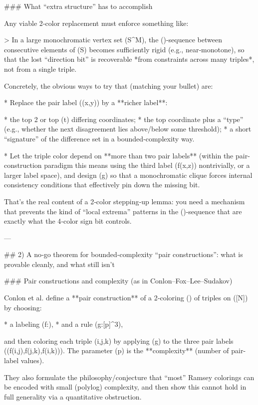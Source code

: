 ### What “extra structure” has to accomplish

Any viable 2‑color replacement must enforce something like:

> In a large monochromatic vertex set (S^M), the (\delta)-sequence between consecutive elements of (S) becomes sufficiently rigid (e.g., near‑monotone), so that the lost “direction bit” is recoverable *from constraints across many triples*, not from a single triple.

Concretely, the obvious ways to try that (matching your bullet) are:

* Replace the pair label (\delta(x,y)) by a **richer label**:

* the top 2 or top (t) differing coordinates;
* the top coordinate plus a “type” (e.g., whether the next disagreement lies above/below some threshold);
* a short “signature” of the difference set in a bounded‑complexity way.

* Let the triple color depend on **more than two pair labels** (within the pair-construction paradigm this means using the third label (f(x,z)) nontrivially, or a larger label space), and design (g) so that a monochromatic clique forces internal consistency conditions that effectively pin down the missing bit.

That’s the real content of a 2‑color stepping‑up lemma: you need a mechanism that prevents the kind of “local extrema” patterns in the (\delta)-sequence that are exactly what the 4‑color sign bit controls.

---

## 2) A no‑go theorem for bounded‑complexity “pair constructions”: what is provable cleanly, and what still isn’t

### Pair constructions and complexity (as in Conlon–Fox–Lee–Sudakov)

Conlon et al. define a **pair construction** of a 2‑coloring (\chi) of triples on ([N]) by choosing:

* a labeling (f:\to [p]),
* and a rule (g:[p]^3),

and then coloring each triple ({i,j,k}) by applying (g) to the three pair labels (\big(f(i,j),f(j,k),f(i,k)\big)). The parameter (p) is the **complexity** (number of pair-label values). 

They also formulate the philosophy/conjecture that “most” Ramsey colorings can be encoded with small (polylog) complexity, and then show this cannot hold in full generality via a quantitative obstruction. 

